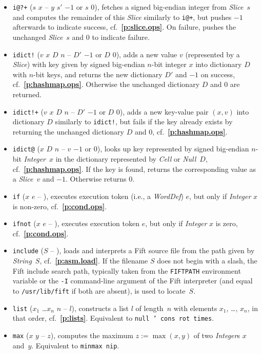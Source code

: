 \documentclass[12pt,oneside]{article}
\def\refpoint#1{{\rm\textbf{\ref{#1}}}}
\let\ptref=\refpoint
\begin{document}
\begin{itemize}
\item {\tt i@?+} ($s$ $x$ -- $y$ $s'$ $-1$ or $s$ $0$), fetches a signed big-endian integer from {\em Slice\/}~$s$ and computes the remainder of this {\em Slice\/} similarly to {\tt i@+}, but pushes $-1$ afterwards to indicate success, cf.~\ptref{p:slice.ops}. On failure, pushes the unchanged {\em Slice\/}~$s$ and $0$ to indicate failure.
\item {\tt idict!} ($v$ $x$ $D$ $n$ -- $D'$ $-1$ or $D$ $0$), adds a new value $v$ (represented by a {\em Slice\/}) with key given by signed big-endian $n$-bit integer $x$ into dictionary $D$ with $n$-bit keys, and returns the new dictionary $D'$ and $-1$ on success, cf.~\ptref{p:hashmap.ops}. Otherwise the unchanged dictionary $D$ and $0$ are returned.
\item {\tt idict!+} ($v$ $x$ $D$ $n$ -- $D'$ $-1$ or $D$ $0$), adds a new key-value pair $(x,v)$ into dictionary $D$ similarly to {\tt idict!}, but fails if the key already exists by returning the unchanged dictionary $D$ and $0$, cf.~\ptref{p:hashmap.ops}.
\item {\tt idict@} ($x$ $D$ $n$ -- $v$ $-1$ or $0$), looks up key represented by signed big-endian $n$-bit {\em Integer\/}~$x$ in the dictionary represented by {\em Cell\/} or {\em Null\/}~$D$, cf.~\ptref{p:hashmap.ops}. If the key is found, returns the corresponding value as a {\em Slice\/}~$v$ and $-1$. Otherwise returns $0$.
\item {\tt if} ($x$ $e$ -- ), executes execution token (i.e., a {\em WordDef\/}) $e$, but only if {\em Integer\/} $x$ is non-zero, cf.~\ptref{p:cond.ops}.
\item {\tt ifnot} ($x$ $e$ -- ), executes execution token $e$, but only if {\em Integer\/} $x$ is zero, cf.~\ptref{p:cond.ops}.
\item {\tt include} ($S$ -- ), loads and interprets a Fift source file from the path given by {\em String\/}~$S$, cf.~\ptref{p:asm.load}. If the filename $S$ does not begin with a slash, the Fift include search path, typically taken from the {\tt FIFTPATH} environment variable or the {\tt -I} command-line argument of the Fift interpreter (and equal to {\tt /usr/lib/fift} if both are absent), is used to locate~$S$.
\item {\tt list} ($x_1$ \dots $x_n$ $n$ -- $l$), constructs a list $l$ of length~$n$ with elements $x_1$, \ldots, $x_n$, in that order, cf.~\ptref{p:lists}. Equivalent to {\tt null ' cons rot times}.
\item {\tt max} ($x$ $y$ -- $z$), computes the maximum $z:=\max(x,y)$ of two {\em Integer\/}s $x$ and~$y$. Equivalent to {\tt minmax nip}.

\end{itemize}
\end{document}
